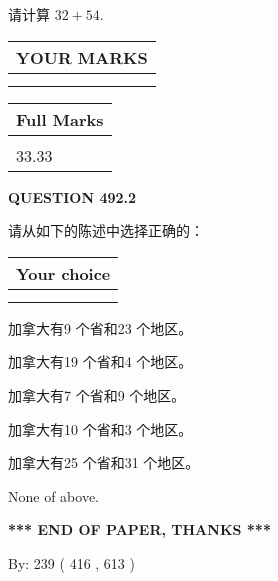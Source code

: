 \documentclass{ctexart}
\begin{document}
  
 
请计算 $ %
32 +  %
54 $.
 

 

 
  
\vspace{0.2in}
  
\noindent\begin{tabular}{|l|}
\hline
 YOUR MARKS  \\
\hline
 \\ 
 \\ 
\hline
\end{tabular}
\hspace{0.05in} \begin{tabular}{|l|}
\hline
 Full Marks  \\
\hline
 \\ 
33.33 \\
\hline
\end{tabular}
{\textbf{\Large{QUESTION
492.2 
}}}
  
  
请从如下的陈述中选择正确的：
  
  
\noindent\hspace{3.0in} \begin{tabular}{|l|}
\hline
Your choice \\
\hline
 \\ 
 \\ 
\hline
\end{tabular}
  
  
 
 
加拿大有9 个省和23 个地区。
 
 
加拿大有19 个省和4 个地区。
 
 
加拿大有7 个省和9 个地区。
 
 
加拿大有10 个省和3 个地区。
 
 
加拿大有25 个省和31 个地区。
 
 
 None of above.
 
 
   
   
 \vspace{0.2in}
 
   
   
   
   
\vspace{1.0in} 
{\textbf{\large{ *** END OF PAPER, THANKS *** }}} 
   
   
\hspace{1.0in} By: 
 239 ( 416 ,  613 )
   
\end{document}
